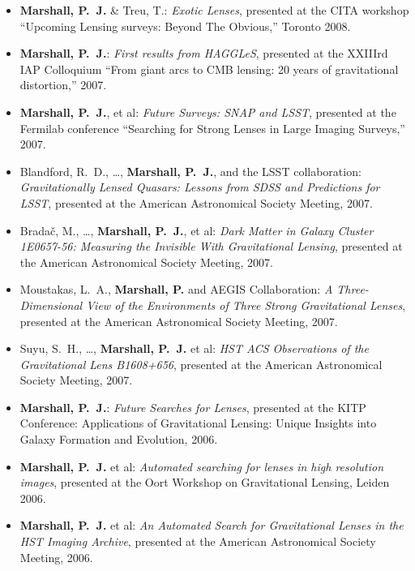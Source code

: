 \begin{itemize}
\item{\textbf{Marshall, P.~J.} \& Treu, T.:
\textit{Exotic Lenses},
presented at the CITA workshop
``Upcoming Lensing surveys: Beyond The Obvious,'' Toronto 2008.
}

\item{\textbf{Marshall, P.~J.}:
\textit{First results from HAGGLeS},
presented at the XXIIIrd IAP Colloquium
``From giant arcs to CMB lensing: 20 years of gravitational distortion,'' 2007.
}

\item{\textbf{Marshall, P.~J.}, et al:
\textit{Future Surveys: SNAP and LSST},
presented at the Fermilab conference
``Searching for Strong Lenses in Large Imaging Surveys,'' 2007.
}

\item{{Blandford}, R.~D., \dots, \textbf{Marshall, P.~J.}, and the {LSST collaboration}:
\textit{Gravitationally Lensed Quasars: Lessons from SDSS and Predictions for LSST},
presented at the {American Astronomical Society Meeting}, 2007.
}

\item{{Brada\v{c}}, M., \ldots, \textbf{Marshall, P.~J.}, et al:
\textit{Dark Matter in Galaxy Cluster 1E0657-56: Measuring the Invisible With Gravitational Lensing},
presented at the {American Astronomical Society Meeting}, 2007.
}

\item{{Moustakas}, L.~A., \textbf{Marshall, P.} and {AEGIS Collaboration}:
\textit{A Three-Dimensional View of the Environments of Three Strong Gravitational Lenses},
presented at the {American Astronomical Society Meeting}, 2007.
}

\item{{Suyu}, S.~H., \ldots, \textbf{Marshall, P.~J.} et al:
\textit{HST ACS Observations of the Gravitational Lens B1608+656},
presented at the {American Astronomical Society Meeting}, 2007.
}

\item{\textbf{Marshall, P.~J.}:
\textit{Future Searches for Lenses},
presented at the KITP Conference: Applications of Gravitational Lensing:
Unique Insights into Galaxy Formation and Evolution, 2006.
}

\item{\textbf{{Marshall}, P.~J.} et al:
\textit{Automated searching for lenses in high resolution images},
presented at the {Oort Workshop on Gravitational Lensing}, Leiden 2006.
}

\item{\textbf{{Marshall}, P.~J.} et al:
\textit{An Automated Search for Gravitational Lenses in the HST Imaging Archive},
presented at the {American Astronomical Society Meeting}, 2006.
}


\end{itemize}
